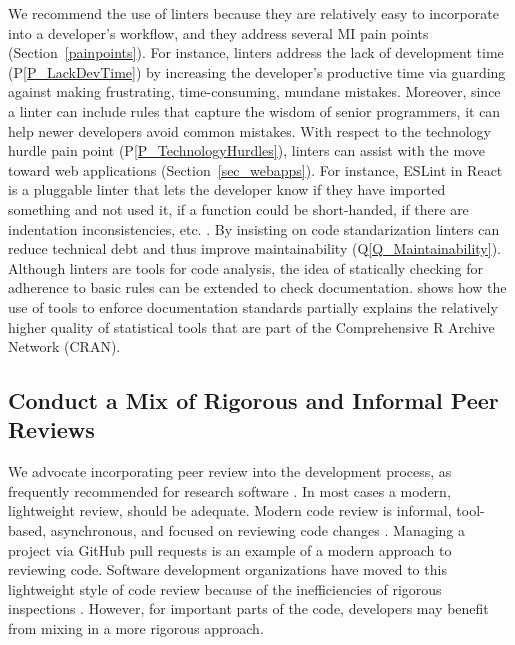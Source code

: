 \documentclass[final, 3p, times, authoryear]{elsarticle}
\newcommand{\ppref}[1]{P\ref{#1}}
\newcommand{\qref}[1]{Q\ref{#1}}
\begin{document}
We recommend the use of linters because they are relatively easy to incorporate
into a developer's workflow, and they address several MI pain points
(Section~\ref{painpoints}).  For instance, linters address the lack of
development time (\ppref{P_LackDevTime}) by increasing the developer's
productive time via guarding against making frustrating, time-consuming, mundane
mistakes.  Moreover, since a linter can include rules that capture the wisdom of
senior programmers, it can help newer developers avoid common mistakes. With
respect to the technology hurdle pain point (\ppref{P_TechnologyHurdles}),
linters can assist with the move toward web applications
(Section~\ref{sec_webapps}).  For instance, ESLint in React is a pluggable
linter that lets the developer know if they have imported something and not used
it, if a function could be short-handed, if there are indentation
inconsistencies, etc. \citep{Whitehouse2018}. By insisting on code
standarization linters can reduce technical debt and thus improve
maintainability (\qref{Q_Maintainability}). Although linters are tools for code
analysis, the idea of statically checking for adherence to basic rules can be
extended to check documentation. \citet{SmithEtAl2018_StatSoft} shows how the
use of tools to enforce documentation standards partially explains the
relatively higher quality of statistical tools that are part of the
Comprehensive R Archive Network (CRAN).

\subsection{Conduct a Mix of Rigorous and Informal Peer Reviews} \label{Sec_PeerReview}

We advocate incorporating peer review into the development process, as
frequently recommended for research software \citep{HerouxEtAl2008, Givler2020,
OrvizEtAl2017, USGS2019}. In most cases a modern, lightweight review, should be
adequate.  Modern code review is informal, tool-based, asynchronous, and focused
on reviewing code changes \citep{SadowskiEtAl2018}. Managing a project via
GitHub pull requests is an example of a modern approach to reviewing code.
Software development organizations have moved to this lightweight style of code
review because of the inefficiencies of rigorous inspections
\citep{RigbyAndBird2013}.  However, for important parts of the code, developers
may benefit from mixing in a more rigorous approach. 
\end{document}
